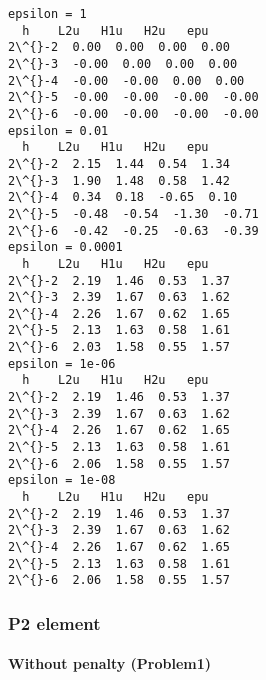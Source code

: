 \documentclass[11pt]{article}
\begin{document}
    \begin{Verbatim}[commandchars=\\\{\}]
epsilon = 1
  h    L2u   H1u   H2u   epu
2\^{}-2  0.00  0.00  0.00  0.00
2\^{}-3  -0.00  0.00  0.00  0.00
2\^{}-4  -0.00  -0.00  0.00  0.00
2\^{}-5  -0.00  -0.00  -0.00  -0.00
2\^{}-6  -0.00  -0.00  -0.00  -0.00
epsilon = 0.01
  h    L2u   H1u   H2u   epu
2\^{}-2  2.15  1.44  0.54  1.34
2\^{}-3  1.90  1.48  0.58  1.42
2\^{}-4  0.34  0.18  -0.65  0.10
2\^{}-5  -0.48  -0.54  -1.30  -0.71
2\^{}-6  -0.42  -0.25  -0.63  -0.39
epsilon = 0.0001
  h    L2u   H1u   H2u   epu
2\^{}-2  2.19  1.46  0.53  1.37
2\^{}-3  2.39  1.67  0.63  1.62
2\^{}-4  2.26  1.67  0.62  1.65
2\^{}-5  2.13  1.63  0.58  1.61
2\^{}-6  2.03  1.58  0.55  1.57
epsilon = 1e-06
  h    L2u   H1u   H2u   epu
2\^{}-2  2.19  1.46  0.53  1.37
2\^{}-3  2.39  1.67  0.63  1.62
2\^{}-4  2.26  1.67  0.62  1.65
2\^{}-5  2.13  1.63  0.58  1.61
2\^{}-6  2.06  1.58  0.55  1.57
epsilon = 1e-08
  h    L2u   H1u   H2u   epu
2\^{}-2  2.19  1.46  0.53  1.37
2\^{}-3  2.39  1.67  0.63  1.62
2\^{}-4  2.26  1.67  0.62  1.65
2\^{}-5  2.13  1.63  0.58  1.61
2\^{}-6  2.06  1.58  0.55  1.57
    \end{Verbatim}

    \subsubsection{P2 element}\label{p2-element}

    \paragraph{Without penalty (Problem1)}\label{without-penalty-problem1}
\end{document}
